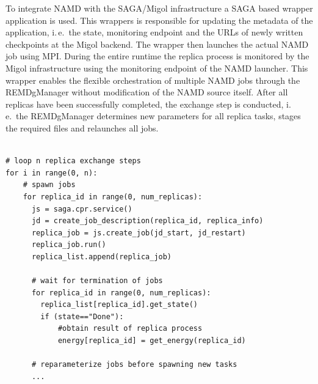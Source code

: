 \documentclass[times, 10pt,twocolumn]{article}
\newcommand{\jhanote}[1]{ {\textcolor{red} { ***SJ: #1 }}}
\newcommand{\jhanote}[1]{}
\begin{document}
To integrate NAMD with the SAGA/Migol infrastructure a SAGA based wrapper application is used. 
This wrappers is responsible for updating the metadata of the application, i.\,e.\ the state, 
monitoring endpoint and the URLs of newly written checkpoints at the Migol backend. 
The wrapper then launches the actual NAMD job using MPI. During the entire runtime the 
replica process is monitored by the Migol infrastructure using the monitoring endpoint of the NAMD 
launcher. This wrapper enables the flexible orchestration of multiple NAMD jobs through the
 REMDgManager without modification of the NAMD source itself. After all replicas have 
 been successfully completed, the exchange step is conducted, i.\,e.\ the REMDgManager 
 determines new parameters for all replica tasks, stages the required files and relaunches all jobs.

                                             
\begin{lstlisting}[style=myPythonListing, float=t, caption={REMDgManager: Replica Orchestration}, 
label={lst:python_saga_chkpt_reg}]

# loop n replica exchange steps  
for i in range(0, n):     
    # spawn jobs
    for replica_id in range(0, num_replicas):
      js = saga.cpr.service()
      jd = create_job_description(replica_id, replica_info)    
      replica_job = js.create_job(jd_start, jd_restart)
      replica_job.run()
      replica_list.append(replica_job)
     
      # wait for termination of jobs
      for replica_id in range(0, num_replicas):     
        replica_list[replica_id].get_state()
        if (state=="Done"):                          
            #obtain result of replica process
            energy[replica_id] = get_energy(replica_id)
 
      # reparameterize jobs before spawning new tasks      
      ...                    
\end{lstlisting}
\end{document}
